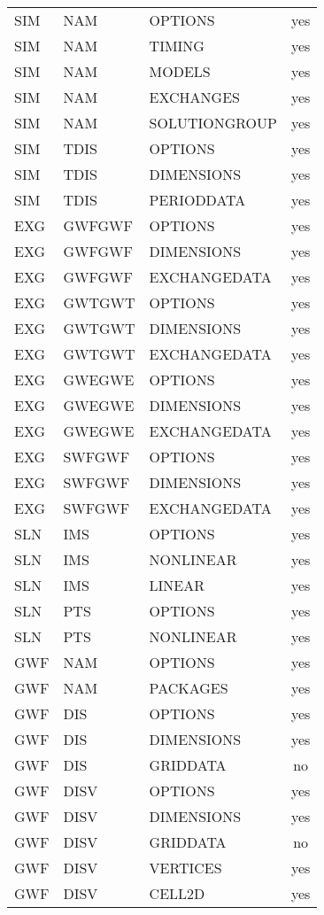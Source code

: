 \begin{longtable}{p{1.5cm} p{1.5cm} p{3cm} c}
\hline
SIM & NAM & OPTIONS & yes \\ 
SIM & NAM & TIMING & yes \\ 
SIM & NAM & MODELS & yes \\ 
SIM & NAM & EXCHANGES & yes \\ 
SIM & NAM & SOLUTIONGROUP & yes \\ 
\hline
SIM & TDIS & OPTIONS & yes \\ 
SIM & TDIS & DIMENSIONS & yes \\ 
SIM & TDIS & PERIODDATA & yes \\ 
\hline
EXG & GWFGWF & OPTIONS & yes \\ 
EXG & GWFGWF & DIMENSIONS & yes \\ 
EXG & GWFGWF & EXCHANGEDATA & yes \\ 
\hline
EXG & GWTGWT & OPTIONS & yes \\ 
EXG & GWTGWT & DIMENSIONS & yes \\ 
EXG & GWTGWT & EXCHANGEDATA & yes \\ 
\hline
EXG & GWEGWE & OPTIONS & yes \\ 
EXG & GWEGWE & DIMENSIONS & yes \\ 
EXG & GWEGWE & EXCHANGEDATA & yes \\ 
\hline
EXG & SWFGWF & OPTIONS & yes \\ 
EXG & SWFGWF & DIMENSIONS & yes \\ 
EXG & SWFGWF & EXCHANGEDATA & yes \\ 
\hline
SLN & IMS & OPTIONS & yes \\ 
SLN & IMS & NONLINEAR & yes \\ 
SLN & IMS & LINEAR & yes \\ 
\hline
SLN & PTS & OPTIONS & yes \\ 
SLN & PTS & NONLINEAR & yes \\ 
\hline
GWF & NAM & OPTIONS & yes \\ 
GWF & NAM & PACKAGES & yes \\ 
\hline
GWF & DIS & OPTIONS & yes \\ 
GWF & DIS & DIMENSIONS & yes \\ 
GWF & DIS & GRIDDATA & no \\ 
\hline
GWF & DISV & OPTIONS & yes \\ 
GWF & DISV & DIMENSIONS & yes \\ 
GWF & DISV & GRIDDATA & no \\ 
GWF & DISV & VERTICES & yes \\ 
GWF & DISV & CELL2D & yes \\ 

\end{longtable}
